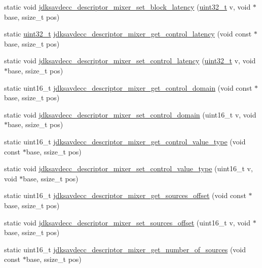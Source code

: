 \begin{DoxyCompactItemize}
\item 
static void \hyperlink{group__descriptor__mixer_ga27b42d3b9fd5f0a5af3694b91c2f01a4}{jdksavdecc\+\_\+descriptor\+\_\+mixer\+\_\+set\+\_\+block\+\_\+latency} (\hyperlink{parse_8c_a6eb1e68cc391dd753bc8ce896dbb8315}{uint32\+\_\+t} v, void $\ast$base, ssize\+\_\+t pos)
\item 
static \hyperlink{parse_8c_a6eb1e68cc391dd753bc8ce896dbb8315}{uint32\+\_\+t} \hyperlink{group__descriptor__mixer_ga41c1e5952dbbf89e8066f321a9f83fdd}{jdksavdecc\+\_\+descriptor\+\_\+mixer\+\_\+get\+\_\+control\+\_\+latency} (void const $\ast$base, ssize\+\_\+t pos)
\item 
static void \hyperlink{group__descriptor__mixer_ga3ff852117feb062022cff7c3f86718e6}{jdksavdecc\+\_\+descriptor\+\_\+mixer\+\_\+set\+\_\+control\+\_\+latency} (\hyperlink{parse_8c_a6eb1e68cc391dd753bc8ce896dbb8315}{uint32\+\_\+t} v, void $\ast$base, ssize\+\_\+t pos)
\item 
static uint16\+\_\+t \hyperlink{group__descriptor__mixer_ga4433959abad55c62b5393a1058eaf8b5}{jdksavdecc\+\_\+descriptor\+\_\+mixer\+\_\+get\+\_\+control\+\_\+domain} (void const $\ast$base, ssize\+\_\+t pos)
\item 
static void \hyperlink{group__descriptor__mixer_ga8e53538f8d09c11d0dab47f1cbc3e6a5}{jdksavdecc\+\_\+descriptor\+\_\+mixer\+\_\+set\+\_\+control\+\_\+domain} (uint16\+\_\+t v, void $\ast$base, ssize\+\_\+t pos)
\item 
static uint16\+\_\+t \hyperlink{group__descriptor__mixer_gad5688e7d9672f19c0a78894c2b4f60e9}{jdksavdecc\+\_\+descriptor\+\_\+mixer\+\_\+get\+\_\+control\+\_\+value\+\_\+type} (void const $\ast$base, ssize\+\_\+t pos)
\item 
static void \hyperlink{group__descriptor__mixer_ga771f98126a9ce6bc1258b4e539771873}{jdksavdecc\+\_\+descriptor\+\_\+mixer\+\_\+set\+\_\+control\+\_\+value\+\_\+type} (uint16\+\_\+t v, void $\ast$base, ssize\+\_\+t pos)
\item 
static uint16\+\_\+t \hyperlink{group__descriptor__mixer_gaf1cabb8917bea8683fddb27083581053}{jdksavdecc\+\_\+descriptor\+\_\+mixer\+\_\+get\+\_\+sources\+\_\+offset} (void const $\ast$base, ssize\+\_\+t pos)
\item 
static void \hyperlink{group__descriptor__mixer_ga815f391c6bc2ec5a36c84de133d1a137}{jdksavdecc\+\_\+descriptor\+\_\+mixer\+\_\+set\+\_\+sources\+\_\+offset} (uint16\+\_\+t v, void $\ast$base, ssize\+\_\+t pos)
\item 
static uint16\+\_\+t \hyperlink{group__descriptor__mixer_ga56f98377aec36a7ab390a818dce6518d}{jdksavdecc\+\_\+descriptor\+\_\+mixer\+\_\+get\+\_\+number\+\_\+of\+\_\+sources} (void const $\ast$base, ssize\+\_\+t pos)

\end{DoxyCompactItemize}

